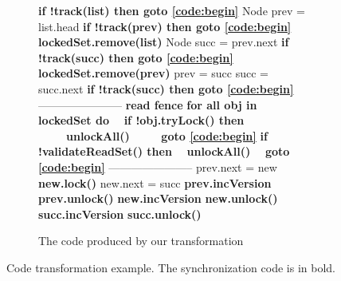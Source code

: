 \begin{figure*}
\begin{center}
\begin{subfigure}[b]{.47\textwidth}
\begin{algorithmic}[1]{}
{            \State{\spOne}\textbf{if !track(list)  then {goto} \ref{code:begin}} \label{code:readGhaseGoto0}
			\State{\spOne}Node prev = list.head
			\State{\spOne}\textbf{if !track(prev)  then {goto} \ref{code:begin}} \label{code:readGhaseGoto1}
            \State{\spOne}\textbf{lockedSet.remove(list)} \label{code:lockedSet:remove1}
			\State{\spOne}Node succ = prev.next
			\State{\spOne}\textbf{if !track(succ) then {goto} \ref{code:begin}}  \label{code:readGhaseGoto2}
			\State{\spOne}\textbf{lockedSet.remove(prev)} \label{code:lockedSet:remove2}
			\State{\spZero}prev = succ
			\State{\spZero}succ = succ.next
			\State{\spZero}\textbf{if !track(succ) then {goto} \ref{code:begin}} \label{code:readGhaseGoto3}
			\Statex -----------------------
			\State{\spZero}\textbf{read fence} \label{code:fence}
			\State{\spZero}\textbf{for all obj in lockedSet do} \label{code:validateLockedSet}	
            \State{\spZero}\ \ \textbf{if !obj.tryLock() then}
            \State{\spZero}\ \ \ \ \ \textbf{unlockAll()}
            \State{\spZero}\ \ \ \ \ \textbf{{goto} \ref{code:begin}} \label{code:validateGoto1}
			\State{\spZero}\textbf{if !validateReadSet() then} 		\label{code:validateReadSet}
				\State{\spZero}\ \ \textbf{unlockAll()}
				\State{\spZero}\ \ \textbf{{goto} \ref{code:begin}} \label{code:validateGoto2}
			\Statex -----------------------
			\State{\spZero}prev.next = new
			\State{\spZero}\textbf{new.lock()}
			\State{\spZero}new.next = succ			
			\State{\spZero}\textbf{prev.incVersion}
			\State{\spZero}\textbf{prev.unlock()}
			\State{\spZero}\textbf{new.incVersion}
			\State{\spZero}\textbf{new.unlock()}
			\State{\spZero}\textbf{succ.incVersion}
			\State{\spZero}\textbf{succ.unlock()}

			\EndFunction
			}
		\end{algorithmic}
		\caption{The code produced by our  transformation}\label{figure:transformation:after}
	\end{subfigure}
	\end{center}
\vspace{-4mm}
	\caption{Code transformation example.
	The synchronization code is in bold.
			\label{figure:transformation}}
\end{figure*}

